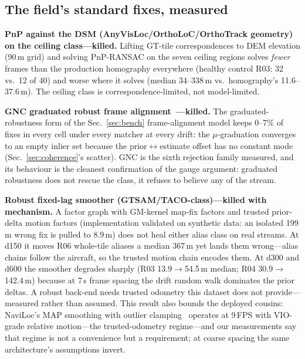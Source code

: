 \documentclass[journal]{IEEEtran}
\begin{document}
\subsection{The field's standard fixes, measured}
\label{sec:fixes}

\textbf{PnP against the DSM (AnyVisLoc/OrthoLoC/OrthoTrack geometry) on the ceiling class---killed.} Lifting GT-tile correspondences to DEM elevation (90\,m grid) and solving PnP-RANSAC on the seven ceiling regions solves \emph{fewer} frames than the production homography everywhere (healthy control R03: 32 vs.\ 12 of 40) and worse where it solves (median 34--338\,m vs.\ homography's 11.6--37.6\,m). The ceiling class is correspondence-limited, not model-limited.

\textbf{GNC graduated robust frame alignment~\cite{yang2020}---killed.} The graduated-robustness form of the Sec.~\ref{sec:bench} frame-alignment model keeps 0--7\% of fixes in every cell under every matcher at every drift: the $\mu$-graduation converges to an empty inlier set because the prior$\leftrightarrow$estimate offset has no constant mode (Sec.~\ref{sec:coherence}'s scatter). GNC is the sixth rejection family measured, and its behaviour is the cleanest confirmation of the gauge argument: graduated robustness does not rescue the class, it refuses to believe any of the stream.

\textbf{Robust fixed-lag smoother (GTSAM/TACO-class)---killed with mechanism.} A factor graph with GM-kernel map-fix factors and trusted prior-delta motion factors (implementation validated on synthetic data: an isolated 199\,m wrong fix is pulled to 8.9\,m) does not heal either alias class on real streams. At d150 it moves R06 whole-tile aliases a median 367\,m yet lands them wrong---alias chains follow the aircraft, so the trusted motion chain encodes them. At d300 and d600 the smoother degrades sharply (R03 13.9$\to$54.5\,m median; R04 30.9$\to$142.4\,m) because at 7\,s frame spacing the drift random walk dominates the prior deltas. A robust back-end needs trusted odometry this dataset does not provide---measured rather than assumed. This result also bounds the deployed cousins: NaviLoc's MAP smoothing with outlier clamping~\cite{naviloc} operates at 9\,FPS with VIO-grade relative motion---the trusted-odometry regime---and our measurements say that regime is not a convenience but a requirement; at coarse spacing the same architecture's assumptions invert.
\end{document}
